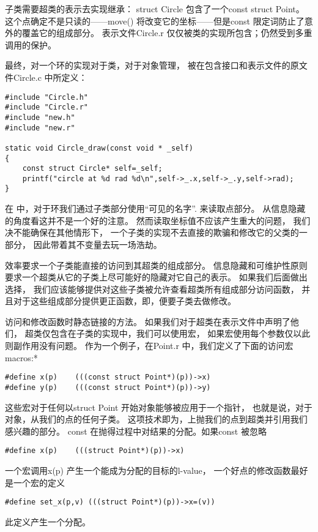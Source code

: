子类需要超类的表示去实现继承：
struct Circle 包含了一个const struct Point。
这个点确定不是只读的——move() 将改变它的坐标——但是const 限定词防止了意外的覆盖它的组成部分。
表示文件Circle.r 仅仅被类的实现所包含；仍然受到多重调用的保护。

最终，对一个环的实现对于类，对于对象管理，
被在包含接口和表示文件的原文件Circle.c 中所定义：
\begin{lstlisting}
#include "Circle.h"
#include "Circle.r"
#include "new.h"
#include "new.r"

static void Circle_draw(const void * _self)
{
    const struct Circle* self=_self;
    printf("circle at %d rad %d\n",self->_.x,self->_.y,self->rad);
}
\end{lstlisting}

在 中，对于环我们通过子类部分使用“可见的名字”\ccode{_}. 来读取点部分。
从信息隐藏的角度看这并不是一个好的注意。
然而读取坐标值不应该产生重大的问题，
我们决不能确保在其他情形下，
一个子类的实现不去直接的欺骗和修改它的父类的一部分，
因此带着其不变量去玩一场浩劫。

效率要求一个子类能直接的访问到其超类的组成部分。
信息隐藏和可维护性原则要求一个超类从它的子类上尽可能好的隐藏对它自己的表示。
如果我们后面做出选择，
我们应该能够提供对这些子类被允许查看超类所有组成部分访问函数，
并且对于这些组成部分提供更正函数，即，便要子类去做修改。

访问和修改函数时静态链接的方法。
如果我们对于超类在表示文件中声明了他们，
超类仅包含在子类的实现中，我们可以使用宏，
如果宏使用每个参数仅以此则副作用没有问题。
作为一个例子，在Point.r 中，我们定义了下面的访问宏macros:*

\begin{lstlisting}
#define x(p)    (((const struct Point*)(p))->x)
#define y(p)    (((const struct Point*)(p))->y)
\end{lstlisting}

这些宏对于任何以struct Point 开始对象能够被应用于一个指针，
也就是说，对于对象，从我们的点的任何子类。
这项技术即为，上抛我们的点到超类并引用我们感兴趣的部分。
const 在抛得过程中对结果的分配。如果const 被忽略
\begin{lstlisting}
#define x(p)    (((struct Point*)(p))->x)
\end{lstlisting}

一个宏调用x(p) 产生一个能成为分配的目标的l-value，
一个好点的修改函数最好是一个宏的定义
\begin{lstlisting}
#define set_x(p,v) (((struct Point*)(p))->x=(v))
\end{lstlisting}
此定义产生一个分配。

